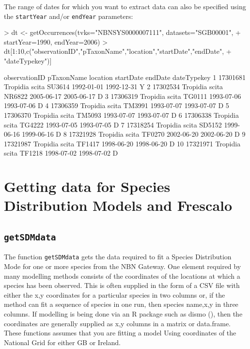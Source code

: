 \documentclass{article}
\begin{document}
The range of dates for which you want to extract data can also be specified 
using the \texttt{startYear} and/or \texttt{endYear} parameters:

\begin{Schunk}
\begin{Sinput}
> dt <- getOccurrences(tvks="NBNSYS0000007111", datasets="SGB00001", 
+                      startYear=1990, endYear=2006)
> dt[1:10,c("observationID","pTaxonName","location","startDate","endDate",
+           "dateTypekey")]
\end{Sinput}
\begin{Soutput}
   observationID     pTaxonName location  startDate    endDate dateTypekey
1       17301681 Tropidia scita   SU3614 1992-01-01 1992-12-31          Y 
2       17302534 Tropidia scita   NR6822 2005-06-17 2005-06-17          D 
3       17306319 Tropidia scita   TG0111 1993-07-06 1993-07-06          D 
4       17306359 Tropidia scita   TM3991 1993-07-07 1993-07-07          D 
5       17306370 Tropidia scita   TM5093 1993-07-07 1993-07-07          D 
6       17306338 Tropidia scita   TG4222 1993-07-05 1993-07-05          D 
7       17318254 Tropidia scita   SD5152 1999-06-16 1999-06-16          D 
8       17321928 Tropidia scita   TF0270 2002-06-20 2002-06-20          D 
9       17321987 Tropidia scita   TF1417 1998-06-20 1998-06-20          D 
10      17321971 Tropidia scita   TF1218 1998-07-02 1998-07-02          D 
\end{Soutput}
\end{Schunk}

\section{Getting data for Species Distribution Models and Frescalo}

\subsection{\texttt{getSDMdata}}
The function \texttt{getSDMdata} gets the data required to fit a Species 
Distribution Mode for one or more species from the NBN Gateway. One element
required by many
modelling methods consists of the coordinates of the locations at which a 
species has been observed. This is often supplied in the form of a CSV file with
either the x,y coordinates for a particular species in two columns or, if the
method can fit a sequence of species in one run, then species name,x,y in three
columns. If modelling is being done via an R package such as dismo 
(\cite{Hijmans2013}), then the coordinates are generally supplied as x,y columns
in a matrix or data.frame. These functions assumes that you are fitting a model
Using coordinates of the National Grid for either GB or Ireland.
\end{document}

